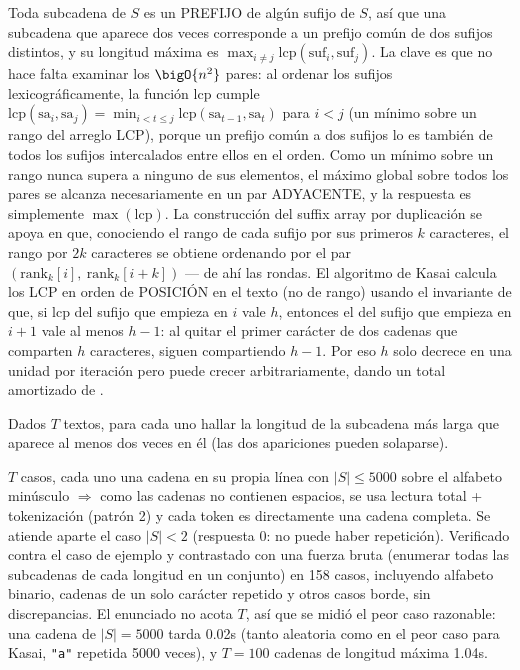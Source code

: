  Toda subcadena de $S$ es un PREFIJO de algún sufijo de $S$, así que una subcadena que aparece dos veces corresponde a un prefijo común de dos sufijos distintos, y su longitud máxima es $\max_{i\neq j} \mathrm{lcp}(\text{suf}_i, \text{suf}_j)$. La clave es que no hace falta examinar los $\bigO{n^2}$ pares: al ordenar los sufijos lexicográficamente, la función $\mathrm{lcp}$ cumple $\mathrm{lcp}(\text{sa}_i,\text{sa}_j) = \min_{i < t \le j} \mathrm{lcp}(\text{sa}_{t-1},\text{sa}_t)$ para $i<j$ (un mínimo sobre un rango del arreglo LCP), porque un prefijo común a dos sufijos lo es también de todos los sufijos intercalados entre ellos en el orden. Como un mínimo sobre un rango nunca supera a ninguno de sus elementos, el máximo global sobre todos los pares se alcanza necesariamente en un par ADYACENTE, y la respuesta es simplemente $\max(\text{lcp})$. La construcción del suffix array por duplicación se apoya en que, conociendo el rango de cada sufijo por sus primeros $k$ caracteres, el rango por $2k$ caracteres se obtiene ordenando por el par $(\mathrm{rank}_k[i],\ \mathrm{rank}_k[i+k])$ — de ahí las  rondas. El algoritmo de Kasai calcula los LCP en orden de POSICIÓN en el texto (no de rango) usando el invariante de que, si $\mathrm{lcp}$ del sufijo que empieza en $i$ vale $h$, entonces el del sufijo que empieza en $i+1$ vale al menos $h-1$: al quitar el primer carácter de dos cadenas que comparten $h$ caracteres, siguen compartiendo $h-1$. Por eso $h$ solo decrece en una unidad por iteración pero puede crecer arbitrariamente, dando un total amortizado de .


Dados $T$ textos, para cada uno hallar la longitud de la subcadena más larga que aparece al menos dos veces en él (las dos apariciones pueden solaparse).

 $T$ casos, cada uno una cadena en su propia línea con $|S| \le 5000$ sobre el alfabeto minúsculo $\Rightarrow$ como las cadenas no contienen espacios, se usa lectura total + tokenización (patrón 2) y cada token es directamente una cadena completa. Se atiende aparte el caso $|S| < 2$ (respuesta $0$: no puede haber repetición). Verificado contra el caso de ejemplo y contrastado con una fuerza bruta (enumerar todas las subcadenas de cada longitud en un conjunto) en 158 casos, incluyendo alfabeto binario, cadenas de un solo carácter repetido y otros casos borde, sin discrepancias. El enunciado no acota $T$, así que se midió el peor caso razonable: una cadena de $|S|=5000$ tarda \aprox{}0.02s (tanto aleatoria como en el peor caso para Kasai, \texttt{"a"} repetida 5000 veces), y $T=100$ cadenas de longitud máxima \aprox{}1.04s.

